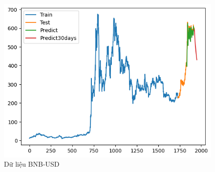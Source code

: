 \documentclass[conference]{IEEEtran}
\begin{document}
\begin{figure}[H]
\begin{minipage}{0.15\textwidth}
				\centering
			\includegraphics[width=1\textwidth]{Figure/GRU_BNB_91.png}
			\end{minipage}
			\caption{Dữ liệu BNB-USD}
			\label{fig:1}
		\end{figure}
\end{document}
